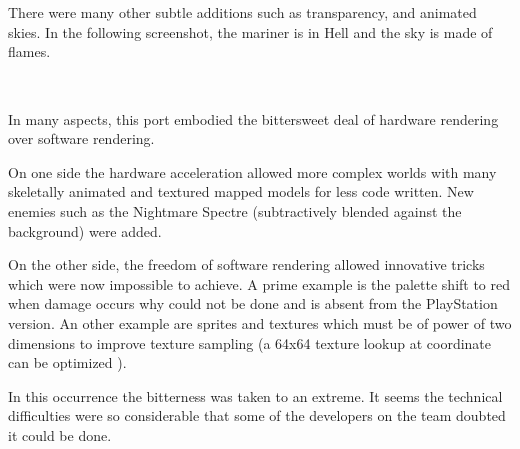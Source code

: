 \\

\\
\par


There were many other subtle additions such as transparency, and animated skies. In the following screenshot, the mariner is in Hell and the sky is made of flames.\\
\par
{}\\
\par
In many aspects, this port embodied the bittersweet deal of hardware rendering over software rendering.\\
\par
On one side the hardware acceleration allowed more complex worlds with many skeletally animated and textured mapped models for less code written. New enemies such as the Nightmare Spectre (subtractively blended against the background) were added.\\
\par
 On the other side, the freedom of software rendering allowed innovative tricks which were now impossible to achieve. A prime example is the palette shift to red when damage occurs why could not be done and is absent from the PlayStation version. An other example are sprites and textures which must be of power of two dimensions to improve texture sampling (a 64x64 texture lookup at coordinate  can be optimized ).\\
\par
In this occurrence the bitterness was taken to an extreme. It seems the technical difficulties were so considerable that some of the developers on the team doubted it could be done.



